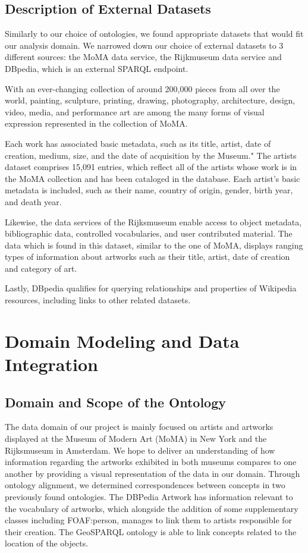 \documentclass{article}
\begin{document}
\subsection{Description of External Datasets}

Similarly to our choice of ontologies, we found appropriate datasets that would fit our analysis domain. We narrowed down our choice of external datasets to 3 different sources: the MoMA data service\cite{Moma}, the Rijkmuseum data service\cite{Rijks} and DBpedia, which is an external SPARQL endpoint\cite{Dbpedia}. 

With an ever-changing collection of around 200,000 pieces from all over the world, painting, sculpture, printing, drawing, photography, architecture, design, video, media, and performance art are among the many forms of visual expression represented in the collection of MoMA.

Each work has associated basic metadata, such as its title, artist, date of creation, medium, size, and the date of acquisition by the Museum." The artists dataset comprises 15,091 entries, which reflect all of the artists whose work is in the MoMA collection and has been cataloged in the database. Each artist's basic metadata is included, such as their name, country of origin, gender, birth year, and death year.

Likewise, the data services of the Rijksmuseum enable access to object metadata, bibliographic data, controlled vocabularies, and user contributed material. The data which is found in this dataset, similar to the one of MoMA, displays ranging types of information about artworks such as their title, artist, date of creation and category of art.

Lastly, DBpedia qualifies for querying relationships and properties of Wikipedia resources, including links to other related datasets.


\section{Domain Modeling and Data Integration}


\subsection{Domain and Scope of the Ontology}


The data domain of our project is mainly focused on artists and artworks displayed at the Museum of Modern Art (MoMA) in New York and the Rijksmuseum in Amsterdam. We hope to deliver an understanding of how information regarding the artworks exhibited in both museums compares to one another by providing a visual representation of the data in our domain. Through ontology alignment, we determined correspondences between concepts in two previously found ontologies. The DBPedia Artwork has information relevant to the vocabulary of artworks, which alongside the addition of some supplementary classes including FOAF:person, manages to link them to artists responsible for their creation. The GeoSPARQL ontology is able to link concepts related to the location of the objects.
\end{document}
